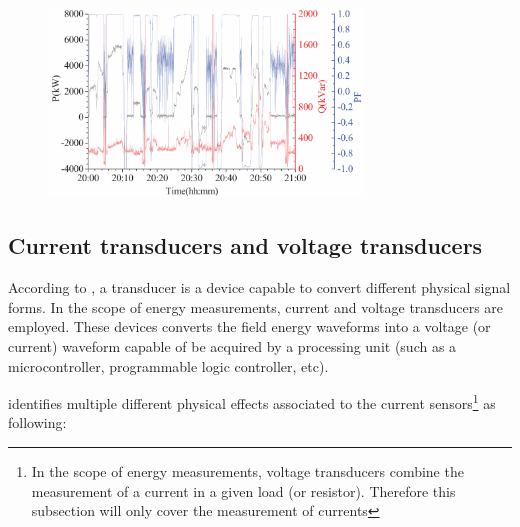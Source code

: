 \begin{figure}[h!]
	\centering
	\begin{minipage}{0.8\textwidth}
		\centering
				\vspace{-0.75em}
		\includegraphics[width=0.75\textwidth,keepaspectratio]{figures/32.EnergyS/liran2014}
				\vspace{-0.75em}
		\label{fig:liran2014}
	\end{minipage}%
	
\end{figure}


\subsection{Current transducers and voltage transducers}
\label{subs:322}	
	According to \cite{webster2012}, a transducer is a device capable to convert different physical signal forms. In the scope of energy measurements, current and voltage transducers are employed. These devices converts the field energy waveforms into a voltage (or current) waveform capable of be acquired by a processing unit (such as a microcontroller, programmable logic controller, etc).
	
	\cite{Dalessandro2007} identifies multiple different physical effects associated to the current sensors\footnote{In the scope of energy measurements, voltage transducers combine the measurement of a current in a given load (or resistor). Therefore this subsection will only cover the measurement of currents} as following:
	
